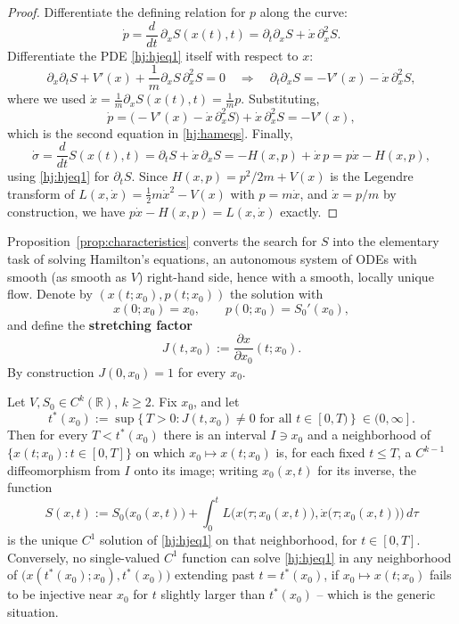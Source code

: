 \begin{proof}
Differentiate the defining relation for $p$ along the curve:
\[
\dot p = \frac{d}{dt}\,\partial_xS(x(t),t) = \partial_t\partial_xS +
    \dot x\,\partial_x^2 S.
\]
Differentiate the PDE \eqref{hj:hjeq1} itself with respect to $x$:
\[
\partial_x\partial_tS + V'(x) + \frac{1}{m}\partial_xS\,\partial_x^2S = 0
\quad\Longrightarrow\quad
\partial_t\partial_xS = -V'(x) - \dot x\,\partial_x^2S,
\]
where we used $\dot x = \frac1m\partial_xS(x(t),t)=\frac1m p$. Substituting,
\[
\dot p = \big(-V'(x)-\dot x\,\partial_x^2S\big) + \dot x\,\partial_x^2S = -V'(x),
\]
which is the second equation in \eqref{hj:hameqs}. Finally,
\[
\dot\sigma = \frac{d}{dt}S(x(t),t) = \partial_tS + \dot x\,\partial_xS = 
    -H(x,p) + \dot x\,p = p\dot x - H(x,p),
\]
using \eqref{hj:hjeq1} for $\partial_tS$. Since $H(x,p)=p^2/2m+V(x)$ 
    is the Legendre transform of $L(x,\dot x)=\tfrac12m\dot x^2-V(x)$ with 
    $p=m\dot x$, and $\dot x=p/m$ by construction, we have 
    $p\dot x-H(x,p)=L(x,\dot x)$ exactly.
\end{proof}

Proposition~\ref{prop:characteristics} converts the search for $S$ into the
elementary task of solving Hamilton's equations, an autonomous system of ODEs
with smooth (as smooth as $V$) right-hand side, hence with a smooth, locally
unique flow. Denote by $(x(t;x_0),p(t;x_0))$ the solution with
\[
x(0;x_0)=x_0, \qquad p(0;x_0)=S_0'(x_0),
\]
and define the \textbf{stretching factor}
\begin{equation}
J(t,x_0) := \frac{\partial x}{\partial x_0}(t;x_0).
\label{hj:Jdef}
\end{equation}
By construction $J(0,x_0)=1$ for every $x_0$.

\begin{theorem}
\label{thm:local}
Let $V,S_0\in C^k(\mathbb{R})$, $k\ge 2$. Fix $x_0$, and let
\begin{equation}
t^\ast(x_0) := \sup\{\,T>0 : J(t,x_0)\ne 0 \text{ for all } t\in[0,T)\,\} \ \in (0,\infty].
\label{hj:tstar}
\end{equation}
Then for every $T<t^\ast(x_0)$ there is an interval $I\ni x_0$ and a
    neighborhood of $\{x(t;x_0): t\in[0,T]\}$ on which $x_0\mapsto x(t;x_0)$
    is, for each fixed $t\le T$, a $C^{k-1}$ diffeomorphism from $I$ onto its
    image; writing $x_0(x,t)$ for its inverse, the function
\[
S(x,t) := S_0\big(x_0(x,t)\big) + \int_0^t L\Big(x\big(\tau;x_0(x,t)\big),
    \dot x\big(\tau;x_0(x,t)\big)\Big)\,d\tau
\]
is the unique $C^1$ solution of \eqref{hj:hjeq1} on that neighborhood, for
    $t\in[0,T]$. Conversely, no single-valued $C^1$ function can solve
    \eqref{hj:hjeq1} in any neighborhood of
    $\big(x(t^\ast(x_0);x_0),t^\ast(x_0)\big)$ extending past $t=t^\ast(x_0)$,
    if $x_0\mapsto x(t;x_0)$ fails to be injective near $x_0$ for $t$ slightly
    larger than $t^\ast(x_0)$ -- which is the generic situation.
\end{theorem}

